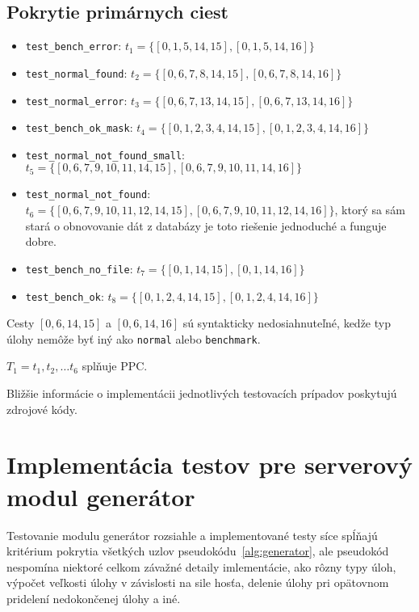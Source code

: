 \subsection*{Pokrytie primárnych ciest}
\begin{itemize}
	\item \texttt{test\_bench\_error}: $t_1 = \{[0, 1, 5, 14, 15], [0, 1, 5, 14, 16]\}$
	\item \texttt{test\_normal\_found}: $t_2 = \{[0, 6, 7, 8, 14, 15], [0, 6, 7, 8, 14, 16]\}$
	\item \texttt{test\_normal\_error}: $t_3 = \{[0, 6, 7, 13, 14, 15], [0, 6, 7, 13, 14, 16]\}$
	\item \texttt{test\_bench\_ok\_mask}: $t_4 = \{[0, 1, 2, 3, 4, 14, 15], [0, 1, 2, 3, 4, 14, 16]\}$
	\item \texttt{test\_normal\_not\_found\_small}: $t_5 = \{[0, 6, 7, 9, 10, 11, 14, 15], [0, 6, 7, 9, 10, 11, 14, 16]\}$
	\item \texttt{test\_normal\_not\_found}: $t_6 = \{[0, 6, 7, 9, 10, 11, 12, 14, 15], [0, 6, 7, 9, 10, 11, 12, 14, 16]\}$, ktorý sa sám stará o obnovovanie dát z databázy je toto riešenie jednoduché a funguje dobre.

	\item \texttt{test\_bench\_no\_file}: $t_7 = \{[0, 1, 14, 15], [0, 1, 14, 16]\}$
	\item \texttt{test\_bench\_ok}: $t_8 = \{[0, 1, 2, 4, 14, 15], [0, 1, 2, 4, 14, 16]\}$
\end{itemize}
Cesty $[0, 6, 14, 15]$ a $[0, 6, 14, 16]$ sú syntakticky nedosiahnuteľné, kedže typ úlohy nemôže byť iný ako \texttt{normal} alebo \texttt{benchmark}.
\begin{center}
$T_1 = {t_1, t_2, \ldots t_6}$ splňuje PPC. 
\end{center}

\bigskip
\noindent
Bližšie informácie o implementácii jednotlivých testovacích prípadov poskytujú zdrojové kódy.


\section{Implementácia testov pre serverový modul generátor}
\label{impl_gen}
Testovanie modulu generátor rozsiahle a implementované testy síce spĺňajú kritérium pokrytia všetkých uzlov pseudokódu~\ref{alg:generator}, ale pseudokód nespomína niektoré celkom závažné detaily imlementácie, ako rôzny typy úloh, výpočet veľkosti úlohy v závislosti na sile hosťa, delenie úlohy pri opätovnom pridelení nedokončenej úlohy a iné.

